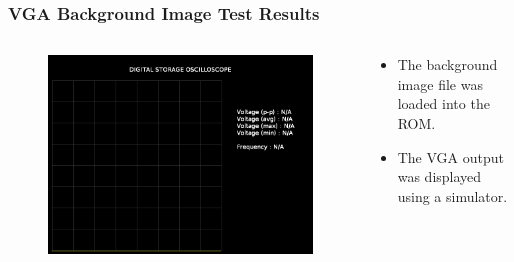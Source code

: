 \documentclass{beamer}
\begin{document}
\begin{frame}
\frametitle{VGA Background Image Test Results}

\begin{columns}[onlytextwidth]
  \begin{column}{0.5\linewidth}
  
    \begin{figure}[!htb]
      \includegraphics[width=\linewidth]{vga_background_test_result.png}
    \end{figure}
    
  \end{column}
  \begin{column}{0.45\linewidth}
  
    \begin{itemize}
      \item The background image file was loaded into the ROM.
      \item The VGA output was displayed using a simulator.
    \end{itemize}
    
  \end{column}
\end{columns}

\end{frame}
\end{document}
